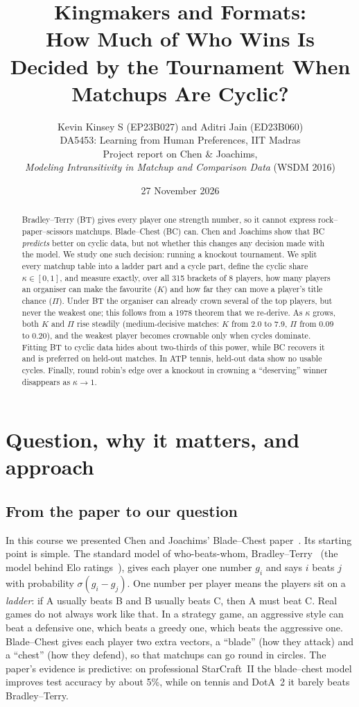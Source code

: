 \documentclass[11pt]{article}
\title{\textbf{Kingmakers and Formats:}\\[2pt]
How Much of Who Wins Is Decided by the Tournament When Matchups Are Cyclic?}
\author{Kevin Kinsey S (EP23B027) \quad and \quad Aditri Jain (ED23B060)\\[2pt]
\small DA5453: Learning from Human Preferences, IIT Madras \\
\small Project report on Chen \& Joachims,\\ \small\emph{Modeling Intransitivity in Matchup and Comparison Data} (WSDM 2016)}
\date{27 November 2026}
\theoremstyle{remark}
\newcommand{\kap}{\kappa}
\begin{document}
\maketitle

\begin{abstract}
\noindent
Bradley--Terry (BT) gives every player one strength number, so it cannot express rock--paper--scissors matchups. Blade--Chest
(BC) can. Chen and Joachims show that BC \emph{predicts} better on cyclic data, but not whether this changes any decision made
with the model. We study one such decision: running a knockout tournament. We split every matchup table into a ladder part and
a cycle part, define the cyclic share $\kap\in[0,1]$, and measure exactly, over all 315 brackets of 8 players, how many
players an organiser can make the favourite ($K$) and how far they can move a player's title chance ($\Pi$). Under BT the
organiser can already crown several of the top players, but never the weakest one; this follows from a 1978 theorem that we
re-derive. As $\kap$ grows, both $K$ and $\Pi$ rise steadily (medium-decisive matches: $K$ from 2.0 to 7.9, $\Pi$ from 0.09 to
0.20), and the weakest player becomes crownable only when cycles dominate. Fitting BT to cyclic data hides about two-thirds of
this power, while BC recovers it and is preferred on held-out matches. In ATP tennis, held-out data show no usable cycles. Finally,
round robin's edge over a knockout in crowning a ``deserving'' winner disappears as $\kap\to 1$.
\end{abstract}

\section{Question, why it matters, and approach}
\label{sec:intro}

\subsection{From the paper to our question}
In this course we presented Chen and Joachims' Blade--Chest paper~\cite{chen2016blade}. Its starting point is simple. The
standard model of who-beats-whom, Bradley--Terry~\cite{bradley1952rank} (the model behind Elo ratings~\cite{elo1978rating}),
gives each player one number $g_i$ and says $i$ beats $j$ with probability $\sigma(g_i-g_j)$. One number per player means
the players sit on a \emph{ladder}: if A usually beats B and B usually beats C, then A must beat C. Real games do not always
work like that. In a strategy game, an aggressive style can beat a defensive one, which beats a greedy one, which beats the
aggressive one. Blade--Chest gives each player two extra vectors, a ``blade'' (how they attack) and a ``chest'' (how they
defend), so that matchups can go round in circles. The paper's evidence is predictive: on professional StarCraft~II the
blade--chest model improves test accuracy by about 5\%, while on tennis and DotA~2 it barely beats Bradley--Terry.
\end{document}
